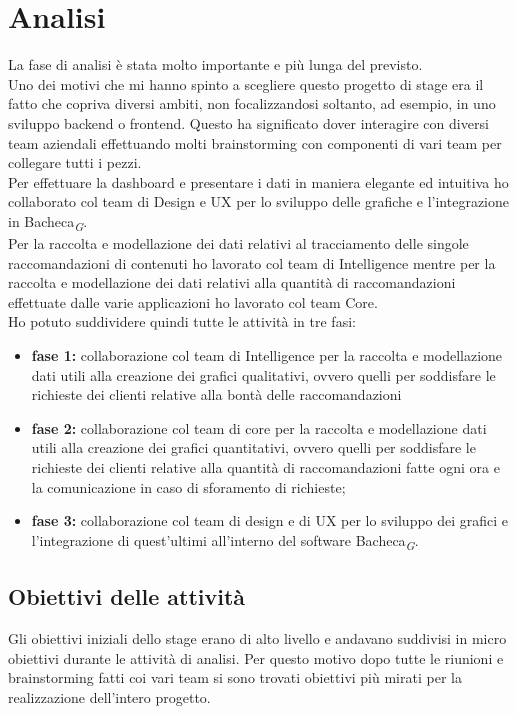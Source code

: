 \documentclass[a4paper, 12pt, twoside, openright]{book}
\newcommand{\gloss}[1]{#1\textsubscript{\textit{\tiny{G}}}}
\begin{document}
\section{Analisi}
\label{analisi}
La fase di analisi è stata molto importante e più lunga del previsto.\\
Uno dei motivi che mi hanno spinto a scegliere questo progetto di stage era il fatto che copriva diversi ambiti, non focalizzandosi soltanto, ad esempio, in uno sviluppo backend o frontend. Questo ha significato dover interagire con diversi team aziendali effettuando molti brainstorming con componenti di vari team per collegare tutti i pezzi.\\
Per effettuare la dashboard e presentare i dati in maniera elegante ed intuitiva ho collaborato col team di Design e UX per lo sviluppo delle grafiche e l'integrazione in \gloss{Bacheca}.\\Per la raccolta e modellazione  dei dati relativi al tracciamento delle singole raccomandazioni di contenuti ho lavorato col team di Intelligence mentre per la raccolta e modellazione dei dati relativi alla quantità di raccomandazioni effettuate dalle varie applicazioni ho lavorato col team Core.\\
Ho potuto suddividere quindi tutte le attività in tre fasi:
\begin{itemize}
\item \textbf{fase 1:} collaborazione col team di Intelligence per la raccolta e modellazione dati utili alla creazione dei grafici qualitativi, ovvero quelli per soddisfare le richieste dei clienti relative alla bontà delle raccomandazioni
\item \textbf{fase 2:} collaborazione col team di core per la raccolta e modellazione dati utili alla creazione dei grafici quantitativi, ovvero quelli per soddisfare le richieste dei clienti relative alla quantità di raccomandazioni fatte ogni ora e la comunicazione in caso di sforamento di richieste;
\item \textbf{fase 3:} collaborazione col team di design e di UX per lo sviluppo dei grafici e l'integrazione di quest'ultimi all'interno del software \gloss{Bacheca}.
\end{itemize}

\newpage{}
\subsection{Obiettivi delle attività}
Gli obiettivi iniziali dello stage erano di alto livello e andavano suddivisi in micro obiettivi durante le attività di analisi. Per questo motivo dopo tutte le riunioni e brainstorming fatti coi vari team si sono trovati obiettivi più mirati per la realizzazione dell'intero progetto.\\
\end{document}
